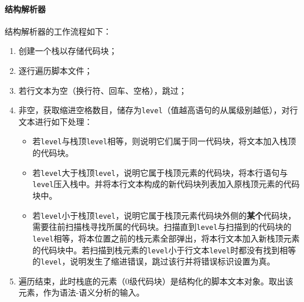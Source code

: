 \documentclass[hyperref]{ctexart}
\begin{document}
\paragraph{结构解析器}
结构解析器的工作流程如下：
\begin{enumerate}
    \item 创建一个栈以存储代码块；
    \item 逐行遍历脚本文件；
    \item 若行文本为空（换行符、回车、空格），跳过；
    \item 非空，获取缩进空格数目，储存为\texttt{level}（值越高语句的从属级别越低），对行文本进行如下处理：
    \begin{itemize}
        \item 若\texttt{level}与栈顶\texttt{level}相等，则说明它们属于同一代码块，将文本加入栈顶的代码块。
        \item 若\texttt{level}大于栈顶\texttt{level}，说明它属于栈顶元素的代码块，将本行语句与\texttt{level}压入栈中。并将本行文本构成的新代码块列表加入原栈顶元素的代码块中。
        \item 若\texttt{level}小于栈顶\texttt{level}，说明它属于栈顶元素代码块外侧的{\bf 某个}代码块，需要往前扫描栈寻找所属的代码块。扫描直到\texttt{level}与扫描到的代码块的\texttt{level}相等，将本位置之前的栈元素全部弹出，将本行文本加入新栈顶元素的代码块中。若扫描到栈元素的\texttt{level}小于行文本\texttt{level}时都没有找到相等的\texttt{level}，说明发生了缩进错误，跳过该行并将错误标识设置为真。
    \end{itemize}
    \item 遍历结束，此时栈底的元素（0级代码块）是结构化的脚本文本对象。取出该元素，作为语法-语义分析的输入。
\end{enumerate}
\end{document}
